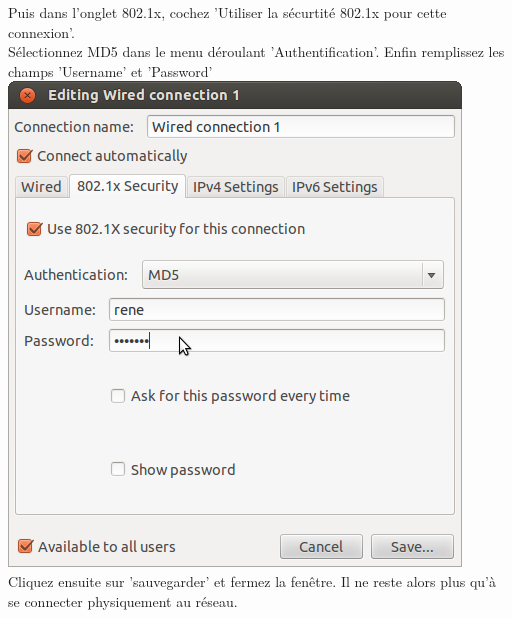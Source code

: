 Puis dans l'onglet 802.1x, cochez 'Utiliser la sécurtité 802.1x pour cette connexion'.\\
Sélectionnez MD5 dans le menu déroulant 'Authentification'. Enfin remplissez les champs 'Username' et 'Password'\\
\includegraphics[width=\screenShotSize{}]{img/md5.png}\\
Cliquez ensuite sur 'sauvegarder' et fermez la fenêtre.
Il ne reste alors plus qu'à se connecter physiquement au réseau.


